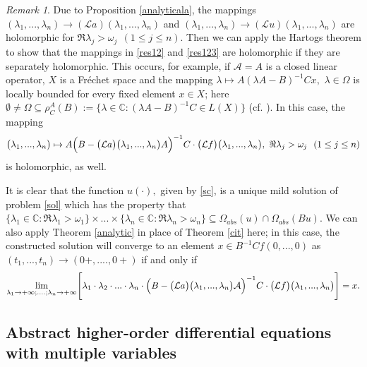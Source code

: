 \documentclass{amsart}
\theoremstyle{definition}
\theoremstyle{remark}
\newtheorem{rem}[thm]{Remark}
\numberwithin{equation}{section}
\begin{document}
\begin{rem}\label{tomici}
Due to Proposition \ref{analyticala}, the mappings $(\lambda_{1},...,\lambda_{n}) \rightarrow ({\mathcal La})(\lambda_{1},...,\lambda_{n}) $ and $(\lambda_{1},...,\lambda_{n}) \rightarrow ({\mathcal Lu})(\lambda_{1},...,\lambda_{n}) $ are holomorphic for $\Re \lambda_{j}>\omega_{j}\ \ (1\leq j\leq n) $. 
Then we can apply the Hartogs theorem to show that the mappings in \eqref{res12} and \eqref{res123} are holomorphic if they are separately holomorphic. This occurs, for example, if ${\mathcal A}=A$ is a closed linear operator, $X$ is a Fr\' echet space and the mapping $\lambda \mapsto A(\lambda A-B)^{-1}Cx,$ $\lambda \in \Omega$ is locally bounded for every fixed element $x\in X$; here $\emptyset \neq \Omega \subseteq \rho_{C}^{A}(B):=\{\lambda\in {\mathbb C} : (\lambda A-B)^{-1}C\in L(X)\}$ (cf. \cite[Proposition 2.1.3(i)]{FKP}). In this case, the mapping{\small
\begin{align*}\bigl( \lambda_{1},...,\lambda_{n}\bigr) \mapsto A\Bigl( B-\bigl({\mathcal L}a\bigr)\bigl( \lambda_{1},...,\lambda_{n}\bigr)A \Bigr)^{-1}C\cdot \bigl({\mathcal L}f\bigr)\bigl( \lambda_{1},...,\lambda_{n}\bigr),\ \Re \lambda_{j}>\omega_{j}\ \ (1\leq j\leq n) \end{align*}} 
is holomorphic, as well.
\end{rem}

It is clear that the function $u(\cdot),$ given by \eqref{sc}, is a unique mild solution of problem \eqref{sol} which has the property that $\{\lambda_{1} \in {\mathbb C} : \Re \lambda_{1}>\omega_{1}\} \times ... \times \{\lambda_{n} \in {\mathbb C} : \Re \lambda_{n}>\omega_{n}\}\subseteq \Omega_{abs}(u) \cap \Omega_{abs}(Bu).$
We can also apply Theorem \ref{analytic} in place of Theorem \ref{cit} here; in this case, the constructed solution will converge to an element $x\in B^{-1}Cf(0,...,0)$ as $(t_{1},...,t_{n})\rightarrow (0+,....,0+)$ if and only if
$$
\lim_{\lambda_{1}\rightarrow +\infty;....;\lambda_{n}\rightarrow +\infty}\Biggl[ \lambda_{1}\cdot\lambda_{2}\cdot ... \cdot \lambda_{n}\cdot\Bigl( B-\bigl({\mathcal L}a\bigr)\bigl( \lambda_{1},...,\lambda_{n}\bigr){\mathcal A} \Bigr)^{-1}C\cdot \bigl({\mathcal L}f\bigr)\bigl( \lambda_{1},...,\lambda_{n}\bigr)\Biggr]=x.
$$

\subsection{Abstract higher-order differential equations with multiple variables}\label{skockao}
\end{document}
